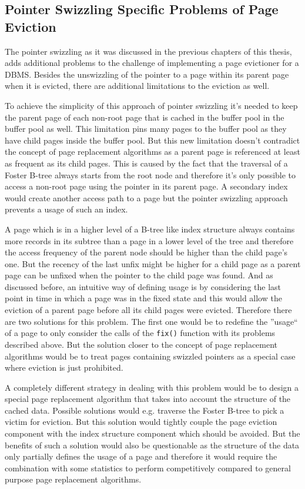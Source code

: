 \subsection[Pointer Swizzling Problems]{Pointer Swizzling Specific Problems of Page Eviction}

    The pointer swizzling as it was discussed in the previous chapters of this thesis, adds additional problems to the challenge of implementing a page evictioner for a DBMS. Besides the unswizzling of the pointer to a page within its parent page when it is evicted, there are additional limitations to the eviction as well.

    To achieve the simplicity of this approach of pointer swizzling it's needed to keep the parent page of each non-root page that is cached in the buffer pool in the buffer pool as well. This limitation pins many pages to the buffer pool as they have child pages inside the buffer pool. But this new limitation doesn't contradict the concept of page replacement algorithms as a parent page is referenced at least as frequent as its child pages. This is caused by the fact that the traversal of a Foster B-tree always starts from the root node and therefore it's only possible to access a non-root page using the pointer in its parent page. A secondary index would create another access path to a page but the pointer swizzling approach prevents a usage of such an index. 

    A page which is in a higher level of a B-tree like index structure always contains more records in its subtree than a page in a lower level of the tree and therefore the access frequency of the parent node should be higher than the child page's one. But the recency of the last unfix might be higher for a child page as a parent page can be unfixed when the pointer to the child page was found. And as discussed before, an intuitive way of defining usage is by considering the last point in time in which a page was in the fixed state and this would allow the eviction of a parent page before all its child pages were evicted. Therefore there are two solutions for this problem. The first one would be to redefine the ''usage`` of a page to only consider the calls of the \lstinline{fix()} function with its problems described above. But the solution closer to the concept of page replacement algorithms would be to treat pages containing swizzled pointers as a special case where eviction is just prohibited.

    A completely different strategy in dealing with this problem would be to design a special page replacement algorithm that takes into account the structure of the cached data. Possible solutions would e.g. traverse the Foster B-tree to pick a victim for eviction. But this solution would tightly couple the page eviction component with the index structure component which should be avoided. But the benefits of such a solution would also be questionable as the structure of the data only partially defines the usage of a page and therefore it would require the combination with some statistics to perform competitively compared to general purpose page replacement algorithms.

